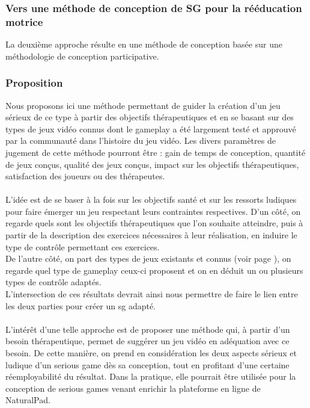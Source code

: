 \subsubsection{Vers une méthode de conception de SG pour la rééducation motrice} \label{part_methode}
	La deuxième approche résulte en une méthode de conception basée sur une méthodologie de conception participative.
	
	\subsubsection*{Proposition}
Nous proposons ici une méthode permettant de guider la création d’un jeu sérieux de ce type à partir des objectifs thérapeutiques et en se basant sur des types de jeux vidéo connus dont le gameplay a été largement testé et approuvé par la communauté dans l’histoire du jeu vidéo. Les divers paramètres de jugement de cette méthode pourront être : gain de temps de conception, quantité de jeux conçus, qualité des jeux conçus, impact sur les objectifs thérapeutiques, satisfaction des joueurs ou des thérapeutes.

\paragraph{}L’idée est de se baser à la fois sur les objectifs santé et sur les ressorts ludiques pour faire émerger un jeu respectant leurs contraintes respectives.
D’un côté, on regarde quels sont les objectifs thérapeutiques que l’on souhaite atteindre, puis à partir de la description des exercices nécessaires à leur réalisation, en induire le type de contrôle permettant ces exercices.\\
De l’autre côté, on part des types de jeux existants et connus (voir page \pageref{types_jeux}), on regarde quel type de gameplay ceux-ci proposent et on en déduit un ou plusieurs types de contrôle adaptés.\\
L’intersection de ces résultats devrait ainsi nous permettre de faire le lien entre les deux parties pour créer un \gls{sg} adapté. 

\paragraph{}L’intérêt d’une telle approche est de proposer une méthode qui, à partir d’un besoin thérapeutique, permet de suggérer un jeu vidéo en adéquation avec ce besoin. De cette manière, on prend en considération les deux aspects sérieux et ludique d’un serious game dès sa conception, tout en profitant d’une certaine réemployabilité du résultat. Dans la pratique, elle pourrait être utilisée pour la conception de serious games venant enrichir la plateforme en ligne de NaturalPad. 

